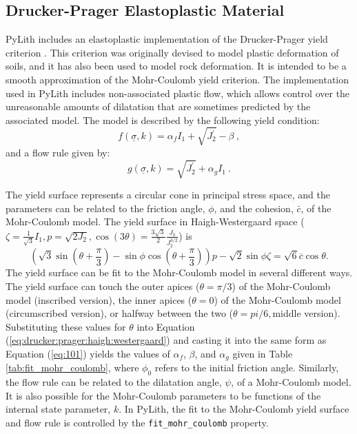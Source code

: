 \subsection{Drucker-Prager Elastoplastic Material}

PyLith includes an elastoplastic implementation of the Drucker-Prager
yield criterion \cite{Drucker:Prager:1952}. This criterion was originally
devised to model plastic deformation of soils, and it has also been
used to model rock deformation. It is intended to be a smooth approximation
of the Mohr-Coulomb yield criterion. The implementation used in PyLith
includes non-associated plastic flow, which allows control over the
unreasonable amounts of dilatation that are sometimes predicted by
the associated model. The model is described by the following yield
condition:
\begin{equation}
f\left(\underline{\sigma},k\right)=\alpha_{f}I_{1}+\sqrt{J_{2}^{\prime}}-\beta\:,\label{eq:100}
\end{equation}
and a flow rule given by:
\begin{equation}
g\left(\underline{\sigma},k\right)=\sqrt{J_{2}^{\prime}}+\alpha_{g}I_{1}\:.\label{eq:101}
\end{equation}

The yield surface represents a circular cone in principal stress space,
and the parameters can be related to the friction angle, $\phi$,
and the cohesion, $\bar{c}$, of the Mohr-Coulomb model. The yield
surface in Haigh-Westergaard space ($\zeta=\frac{1}{\sqrt{3}}I_{1},p=\sqrt{2J_{2}},\cos(3\theta)=\frac{3\sqrt{3}}{2}\frac{J_{3}}{J_{2}^{3/2}}$)
is
\begin{equation}
\left(\sqrt{3}\sin\left(\theta+\frac{\pi}{3}\right)-\sin\phi\cos\left(\theta+\frac{\pi}{3}\right)\right)p-\sqrt{2}\sin\phi\zeta=\sqrt{6}\overline{c}\cos\theta.\label{eq:drucker:prager:haigh:westergaard}
\end{equation}
The yield surface can be fit to the Mohr-Coulomb model in several
different ways. The yield surface can touch the outer apices ($\theta=\pi/3$)
of the Mohr-Coulomb model (inscribed version), the inner apices ($\theta=0$)
of the Mohr-Coulomb model (circumscribed version), or halfway between
the two ($\theta=pi/6,$middle version). Substituting these values
for $\theta$ into Equation (\vref{eq:drucker:prager:haigh:westergaard})
and casting it into the same form as Equation (\vref{eq:101}) yields
the values of $\alpha_{f}$, $\beta$, and $\alpha_{g}$ given in
Table \vref{tab:fit_mohr_coulomb}, where $\phi_{0}$ refers to the
initial friction angle. Similarly, the flow rule can be related to
the dilatation angle, $\psi$, of a Mohr-Coulomb model. It is also
possible for the Mohr-Coulomb parameters to be functions of the internal
state parameter, $k$. In PyLith, the fit to the Mohr-Coulomb yield
surface and flow rule is controlled by the \texttt{fit\_mohr\_coulomb}
property. 

